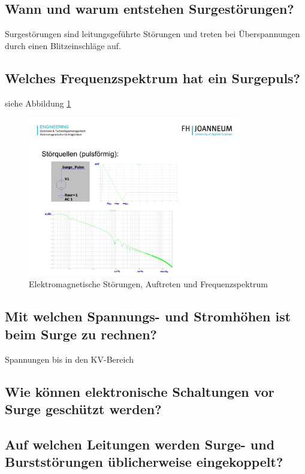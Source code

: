 \subsection{Wann und warum entstehen Surgestörungen?}
Surgestörungen sind leitungsgeführte Störungen und treten bei Überspannungen durch einen Blitzeinschläge auf. 

\subsection{Welches Frequenzspektrum hat ein Surgepuls?}
siehe Abbildung \ref{fig:lv4:surge_puls}
\begin{figure}[ht]
  \centering
  \includegraphics[height=7cm]{src/assets/pictures/lv4_surge_pulse.jpg}
  \caption{Elektromagnetische Störungen, Auftreten und Frequenzspektrum}\label{fig:lv4:surge_puls}
\end{figure}

\subsection{Mit welchen Spannungs- und Stromhöhen ist beim Surge zu rechnen?}
Spannungen bis in den KV-Bereich

\subsection{Wie können elektronische Schaltungen vor Surge geschützt werden?}

\subsection{Auf welchen Leitungen werden Surge- und Burststörungen üblicherweise eingekoppelt?}

\pagebreak
